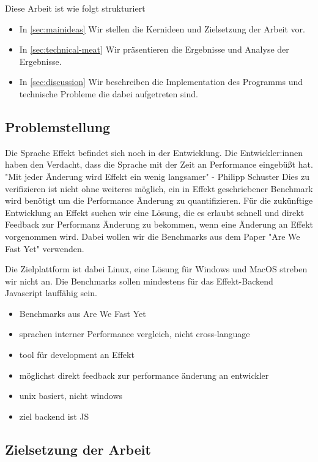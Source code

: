 \medskip
Diese Arbeit ist wie folgt strukturiert
\begin{itemize}
    \item In \cref{sec:mainideas} Wir stellen die Kernideen und Zielsetzung der Arbeit vor.
    \item In \cref{sec:technical-meat} Wir präsentieren die Ergebnisse und Analyse der Ergebnisse.
    \item In \cref{sec:discussion} Wir beschreiben die Implementation des Programms und technische Probleme die dabei aufgetreten sind.
\end{itemize}

\subsection{ Problemstellung }
Die Sprache Effekt befindet sich noch in der Entwicklung. Die Entwickler:innen haben den Verdacht, dass die Sprache mit der Zeit an Performance eingebüßt hat.
"Mit jeder Änderung wird Effekt ein wenig langsamer" - Philipp Schuster
Dies zu verifizieren ist nicht ohne weiteres möglich, ein in Effekt geschriebener Benchmark wird benötigt um die Performance Änderung zu quantifizieren.
Für die zukünftige Entwicklung an Effekt suchen wir eine Lösung, die es erlaubt schnell und direkt Feedback zur Performanz Änderung zu bekommen, wenn eine Änderung an Effekt vorgenommen wird.
Dabei wollen wir die Benchmarks aus dem Paper "Are We Fast Yet" verwenden.

Die Zielplattform ist dabei Linux, eine Lösung für Windows und MacOS streben wir nicht an.
Die Benchmarks sollen mindestens für das Effekt-Backend Javascript lauffähig sein.

\begin{itemize}
    \item Benchmarks aus Are We Fast Yet
    \item sprachen interner Performance vergleich, nicht cross-language
    \item tool für development an Effekt
    \item möglichst direkt feedback zur performance änderung an entwickler
    \item unix basiert, nicht windows
    \item ziel backend ist JS
\end{itemize}

\subsection{ Zielsetzung der Arbeit}

